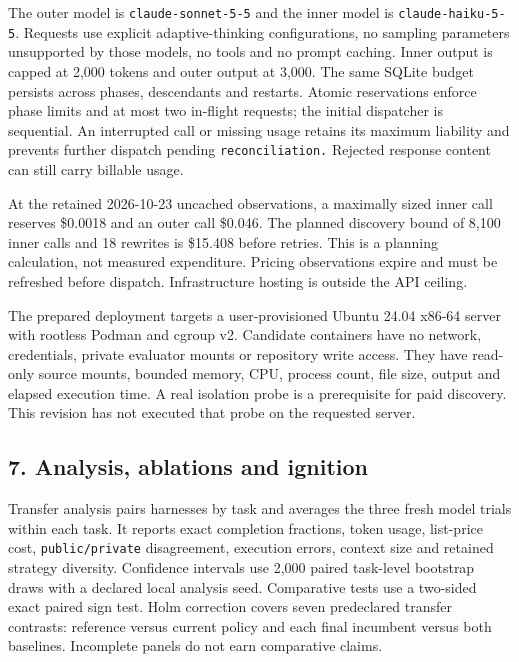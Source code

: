 \documentclass[
  11pt,
]{article}
\begin{document}
The outer model is \nolinkurl{claude-sonnet-5-5} and the inner model is
\nolinkurl{claude-haiku-5-5}. Requests use explicit adaptive-thinking
configurations, no sampling parameters unsupported by those models, no
tools and no prompt caching. Inner output is capped at 2,000 tokens and
outer output at 3,000. The same SQLite budget persists across phases,
descendants and restarts. Atomic reservations enforce phase limits and
at most two in-flight requests; the initial dispatcher is sequential. An
interrupted call or missing usage retains its maximum liability and
prevents further dispatch pending \nolinkurl{reconciliation.} Rejected
response content can still carry billable usage.

At the retained 2026-10-23 uncached observations, a maximally sized
inner call reserves \$0.0018 and an outer call \$0.046. The planned
discovery bound of 8,100 inner calls and 18 rewrites is \$15.408 before
retries. This is a planning calculation, not measured expenditure.
Pricing observations expire and must be refreshed before dispatch.
Infrastructure hosting is outside the API ceiling.

The prepared deployment targets a user-provisioned Ubuntu 24.04 x86-64
server with rootless Podman and cgroup v2. Candidate containers have no
network, credentials, private evaluator mounts or repository write
access. They have read-only source mounts, bounded memory, CPU, process
count, file size, output and elapsed execution time. A real isolation
probe is a prerequisite for paid discovery. This revision has not
executed that probe on the requested server.

\subsection{7. Analysis, ablations and
ignition}\label{analysis-ablations-and-ignition}

Transfer analysis pairs harnesses by task and averages the three fresh
model trials within each task. It reports exact completion fractions,
token usage, list-price cost, \nolinkurl{public/private} disagreement,
execution errors, context size and retained strategy diversity.
Confidence intervals use 2,000 paired task-level bootstrap draws with a
declared local analysis seed. Comparative tests use a two-sided exact
paired sign test. Holm correction covers seven predeclared transfer
contrasts: reference versus current policy and each final incumbent
versus both baselines. Incomplete panels do not earn comparative claims.
\end{document}
